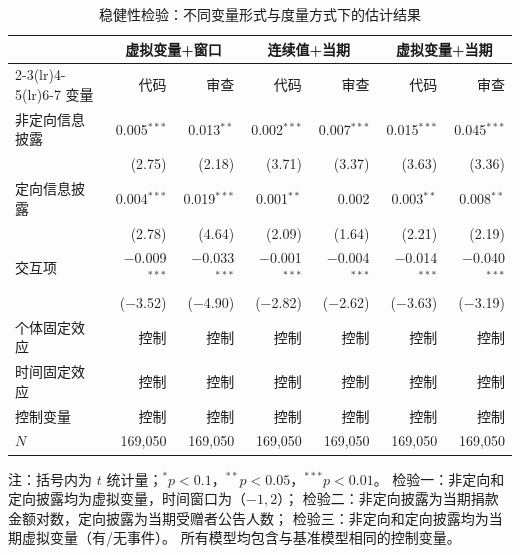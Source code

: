 \documentclass[
    type = master, %
    degree = professional,        %
    decl-page,  %
    twoside,                %
    fontset = fandol %
  ]{njuthesis}
\renewcommand{\footnotesize}{\zihao{-5}}
\begin{document}
\begin{table}[htbp]
    \centering
    \caption{稳健性检验：不同变量形式与度量方式下的估计结果}
    \label{tab:robustness-all}
    \small
    \begin{tabularx}{\textwidth}{Xrrrrrr}
        \toprule
        & \multicolumn{2}{c}{虚拟变量+窗口}
        & \multicolumn{2}{c}{连续值+当期}
        & \multicolumn{2}{c}{虚拟变量+当期} \\
        \cmidrule(lr){2-3}\cmidrule(lr){4-5}\cmidrule(lr){6-7}
        变量 & 代码 & 审查 & 代码 & 审查 & 代码 & 审查 \\
        \midrule
        非定向信息披露
            & 0.005$^{***}$ & 0.013$^{**}$
            & 0.002$^{***}$ & 0.007$^{***}$
            & 0.015$^{***}$ & 0.045$^{***}$ \\
            & (2.75) & (2.18)
            & (3.71) & (3.37)
            & (3.63) & (3.36) \\[0.4em]
        定向信息披露
            & 0.004$^{***}$ & 0.019$^{***}$
            & 0.001$^{**}$ & 0.002
            & 0.003$^{**}$ & 0.008$^{**}$ \\
            & (2.78) & (4.64)
            & (2.09) & (1.64)
            & (2.21) & (2.19) \\[0.4em]
        交互项
            & $-$0.009$^{***}$ & $-$0.033$^{***}$
            & $-$0.001$^{***}$ & $-$0.004$^{***}$
            & $-$0.014$^{***}$ & $-$0.040$^{***}$ \\
            & ($-$3.52) & ($-$4.90)
            & ($-$2.82) & ($-$2.62)
            & ($-$3.63) & ($-$3.19) \\[0.4em]
        \midrule
        个体固定效应 & 控制 & 控制 & 控制 & 控制 & 控制 & 控制 \\
        时间固定效应 & 控制 & 控制 & 控制 & 控制 & 控制 & 控制 \\
        控制变量 & 控制 & 控制 & 控制 & 控制 & 控制 & 控制 \\
        $N$ & 169,050 & 169,050 & 169,050 & 169,050 & 169,050 & 169,050 \\
        \bottomrule
    \end{tabularx}
    \begin{minipage}{\textwidth}
        \vspace{0.3em}
        \footnotesize 注：括号内为 $t$ 统计量；$^{*}p<0.1$，$^{**}p<0.05$，$^{***}p<0.01$。
        检验一：非定向和定向披露均为虚拟变量，时间窗口为（$-1, 2$）；
        检验二：非定向披露为当期捐款金额对数，定向披露为当期受赠者公告人数；
        检验三：非定向和定向披露均为当期虚拟变量（有/无事件）。
        所有模型均包含与基准模型相同的控制变量。
    \end{minipage}
\end{table}
\end{document}
